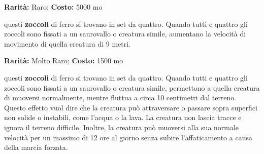 \begin{multicols}{2}

\textbf{Rarità:} Raro; \textbf{Costo:} 5000 mo

questi \textbf{zoccoli} di ferro si trovano in set da quattro. Quando tutti e quattro gli zoccoli sono fissati a un saurovallo o creatura simile, aumentano la velocità di movimento di quella creatura di 9 metri.


\textbf{Rarità:} Molto Raro; \textbf{Costo:} 1500 mo

questi \textbf{zoccoli} di ferro si trovano in set da quattro. Quando tutti e quattro gli zoccoli sono fissati a un saurovallo o creatura simile, permettono a quella creatura di muoversi normalmente, mentre fluttua a circa 10 centimetri dal terreno. Questo effetto vuol dire che la creatura può attraversare o passare sopra superfici non solide o instabili, come l'acqua o la lava. La creatura non lascia tracce e ignora il terreno difficile. Inoltre, la creatura può muoversi alla sua normale velocità per un massimo di 12 ore al giorno senza subire l'affaticamento a causa della marcia forzata.

\end{multicols}






\pagebreak
